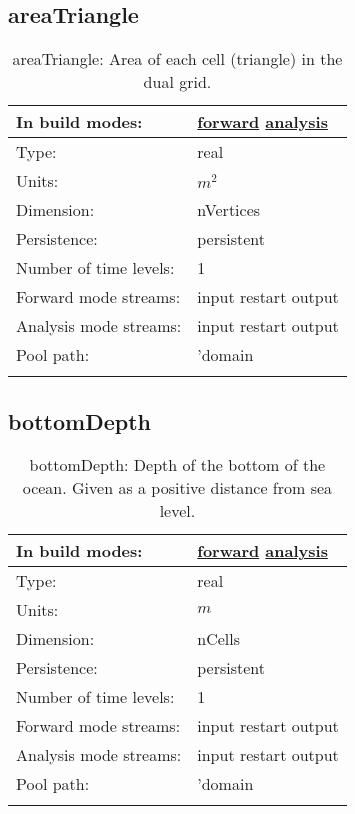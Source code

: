 \subsection[areaTriangle]{areaTriangle}
\label{subsec:var_sec_mesh_areaTriangle}
\begin{center}
\begin{longtable}{| p{2.0in} | p{4.0in} |}
        \hline 
        In build modes: & \hyperref[subsec:forward_var_tab_mesh]{forward} \hyperref[subsec:analysis_var_tab_mesh]{analysis} \\
        \hline 
        Type: & real \\
        \hline 
        Units: & $m^2$ \\
        \hline 
        Dimension: & nVertices \\
        \hline 
        Persistence: & persistent \\
        \hline 
        Number of time levels: & 1 \\
        \hline 
		 Forward mode streams: &  input restart output \\
        \hline 
		 Analysis mode streams: &  input restart output \\
        \hline 
            Pool path: & 'domain %
 \\
		 \hline 
    \caption{areaTriangle: Area of each cell (triangle) in the dual grid.}
\end{longtable}
\end{center}
\subsection[bottomDepth]{bottomDepth}
\label{subsec:var_sec_mesh_bottomDepth}
\begin{center}
\begin{longtable}{| p{2.0in} | p{4.0in} |}
        \hline 
        In build modes: & \hyperref[subsec:forward_var_tab_mesh]{forward} \hyperref[subsec:analysis_var_tab_mesh]{analysis} \\
        \hline 
        Type: & real \\
        \hline 
        Units: & $m$ \\
        \hline 
        Dimension: & nCells \\
        \hline 
        Persistence: & persistent \\
        \hline 
        Number of time levels: & 1 \\
        \hline 
		 Forward mode streams: &  input restart output \\
        \hline 
		 Analysis mode streams: &  input restart output \\
        \hline 
            Pool path: & 'domain %
 \\
		 \hline 
    \caption{bottomDepth: Depth of the bottom of the ocean. Given as a positive distance from sea level.}
\end{longtable}
\end{center}
